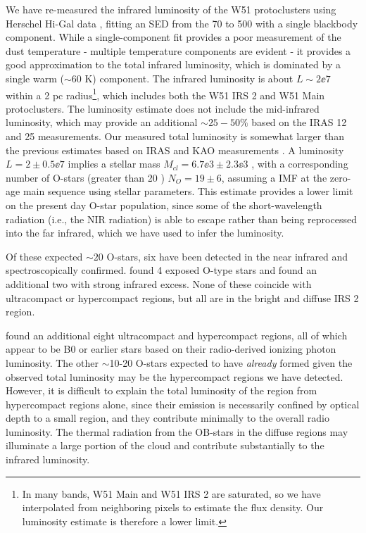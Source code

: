 We have re-measured the infrared luminosity of the W51 protoclusters using Herschel
Hi-Gal data \citep{Molinari2010a,Traficante2011a}, fitting an SED from the 70
to 500 \um with a single blackbody component.
While a single-component fit provides a poor
measurement of the dust temperature - multiple temperature components are
evident \citep{Sievers1991a} - it provides a good approximation to the total
infrared luminosity, which is dominated by a single warm ($\sim60$ K)
component.  The infrared luminosity is about $L\sim2\ee{7}$ \lsun within a 2 pc
radius\footnote{In many bands, W51 Main and W51 IRS 2 are
saturated, so we have interpolated from neighboring pixels to estimate the flux
density.
Our luminosity estimate is therefore a lower limit.}, which includes
both the W51 IRS 2 and W51 Main protoclusters.  The luminosity estimate does not
include the mid-infrared luminosity, which may provide an additional
$\sim25-50\%$ based on
the IRAS 12 and 25 \um measurements.  Our measured total luminosity is somewhat
larger than the previous estimates based on IRAS and KAO measurements
\citep{Harvey1986a,Sievers1991a}.
A luminosity $L=2\pm0.5\ee{7}$ \lsun implies
a stellar mass $M_{cl} = 6.7\ee{3} \pm 2.3\ee{3}$ \msun, with a corresponding number of
O-stars (greater than 20 \msun) $N_O = 19 \pm 6$, assuming a
\citet{Kroupa2001a} IMF at the zero-age main sequence using \citet{Vacca1996a}
stellar parameters.  This estimate provides a lower limit on the present day
O-star population, since some of the short-wavelength radiation (i.e., the NIR
radiation) is able to escape rather than being reprocessed into the far
infrared, which we have used to infer the luminosity.

Of these expected $\sim20$ O-stars, six have been detected in the near infrared
and spectroscopically confirmed.  \citet{Figueredo2008a} found 4 exposed O-type
stars and \citet{Barbosa2008a} found an additional two with strong infrared
excess.  None of these coincide with ultracompact or hypercompact \hii regions,
but all are in the bright and diffuse IRS 2 \hii region.

\citet{Mehringer1994a} found an additional eight ultracompact and hypercompact
\hii regions, all of which appear to be B0 or earlier stars based on their
radio-derived ionizing photon luminosity.  The other $\sim$10-20 O-stars
expected to have \emph{already} formed given the observed total luminosity may
be the hypercompact \hii regions we have detected.  However, it is difficult to
explain the total luminosity of the region from hypercompact \hii regions
alone, since their emission is necessarily confined by optical depth to a small
region, and they contribute minimally to the overall radio luminosity.  The
thermal radiation from the OB-stars in the diffuse \hii regions may illuminate
a large portion of the cloud and contribute substantially to the infrared
luminosity.

